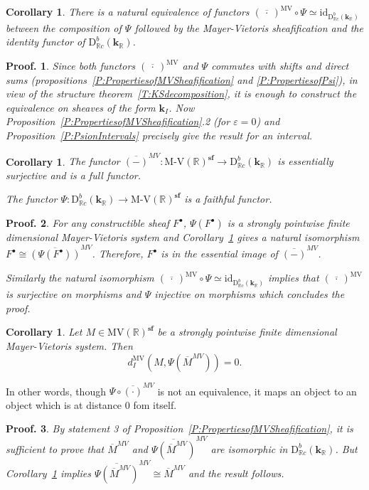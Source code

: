 \documentclass[a4paper, english, 11pt]{article}
\newcommand{\kk}[0]{\textbf{k}}
\newcommand{\0}{\vec{0}}
\newcommand{\R}[0]{\mathbb{R}}
\newcommand{\D}[0]{\text{D}}
\newcommand{\s}{\textbf{sf}}
\newtheorem*{pf}{Proof.} }
\newtheorem{cor}[prop]{Corollary}
\begin{document}
\begin{cor}\label{C:MVcircPsiisId}
 There is a natural equivalence of functors 
 $(\overline{~\cdot~ })^{\text{MV}} \circ \Psi\simeq \text{id}_{\D^b_{\R c}(\kk_\R)}$ between the composition of $\Psi$ followed by the Mayer-Vietoris sheafification and the identity functor of $\D^b_{\R c}(\kk_\R)$.
\end{cor}
\begin{pf}
 Since both functors $(\overline{~\cdot~ })^{\text{MV}}$ and $ \Psi $ commutes with shifts and direct sums (propositions~\ref{P:PropertiesofMVSheafification} and \ref{P:PropertiesofPsi}), in view of the structure theorem~\ref{T:KSdecomposition}, it is enough to construct the equivalence on sheaves of the form $\kk_{I}$. Now Proposition~\ref{P:PropertiesofMVSheafification}.2 (for $\varepsilon=0$) and Proposition~\ref{P:PsionIntervals} precisely give the result for an interval.
\end{pf}
\begin{cor}\label{C:fullorfiathful}
The functor  $\overline{(-)}^{MV}: \text{M-V}(\R)^{\s} \to  \D^b_{\R c}(\kk_\R)$ is essentially surjective and is a full functor. 

The functor $ \Psi:\D^b_{\R c}(\kk_\R)\to  \text{M-V}(\R)^{\s}$  is a faithful functor. 
\end{cor}
\begin{pf}

For  any    constructible sheaf $F^\bullet$, $\Psi(F^\bullet)$ is a 
strongly pointwise finite dimensional Mayer-Vietoris system and Corollary~\ref{C:MVcircPsiisId} gives a natural isomorphism $F^\bullet \cong \overline{(\Psi(F^\bullet))}^{MV} $. Therefore, $F^\bullet$ is in the essential image of $\overline{(-)}^{MV}$.  

\smallskip

Similarly the natural isomorphism  $(\overline{~\cdot~ })^{\text{MV}} \circ \Psi \simeq \text{id}_{\D^b_{\R c}(\kk_\R)}$ implies that $(\overline{~\cdot~ })^{\text{MV}}$ is surjective on morphisms and  $\Psi$ injective on morphisms which concludes the proof.
\end{pf}


\begin{cor}\label{C:MVdisO}
 Let $M\in \mbox{MV}(\R)^\s$ be a strongly pointwise finite dimensional Mayer-Vietoris system. Then 
 $$d_I^{\text{MV}}(M, \Psi ( \overline{M}^{MV})) = 0. $$
\end{cor}
In other words, though $\Psi \circ \overline{(\cdot)}^{MV}$ is not an equivalence, it maps an object to an object which is at distance $0$ fom itself.
\begin{pf}
 By statement 3 of Proposition~\ref{P:PropertiesofMVSheafification}, it is sufficient to prove that $\overline{M}^{MV}$ and $\overline{\Psi(\overline{M}^{MV})}^{MV}$ are isomorphic in $\D^b_{\R c}(\kk_\R)$. But Corollary~\ref{C:MVcircPsiisId} implies  $\overline{\Psi(\overline{M}^{MV})}^{MV} \cong \overline{M}^{MV}$ and the result follows.
\end{pf}
\end{document}
